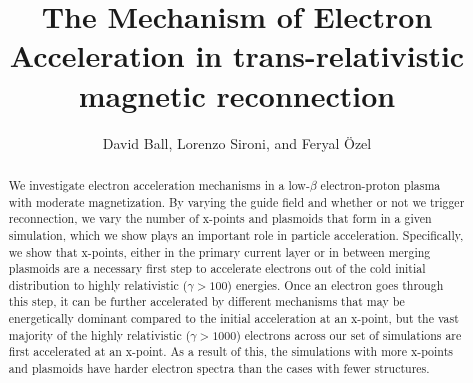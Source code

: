 \documentclass[iop,twocolappendix]{emulateapj}
\begin{document}
\title{The Mechanism of Electron Acceleration in trans-relativistic magnetic reconnection}

\author{David Ball, Lorenzo Sironi, and Feryal \"Ozel}



\begin{abstract}
We investigate electron acceleration mechanisms in a low-$\beta$ electron-proton plasma with moderate magnetization.  By varying the guide field and whether or not we trigger reconnection, we vary the number of x-points and plasmoids that form in a given simulation, which we show plays an important role in particle acceleration.  Specifically, we show that x-points, either in the primary current layer or in between merging plasmoids are a necessary first step to accelerate electrons out of the cold initial distribution to highly relativistic ($\gamma > 100$) energies.  Once an electron goes through this step, it can be further accelerated by different mechanisms that may be energetically dominant compared to the initial acceleration at an x-point, but the vast majority of the highly relativistic ($\gamma > 1000$) electrons across our set of simulations are first accelerated at an x-point.  As a result of this, the simulations with more x-points and plasmoids have harder electron spectra than the cases with fewer structures.




\end{abstract}
\maketitle
\end{document}
